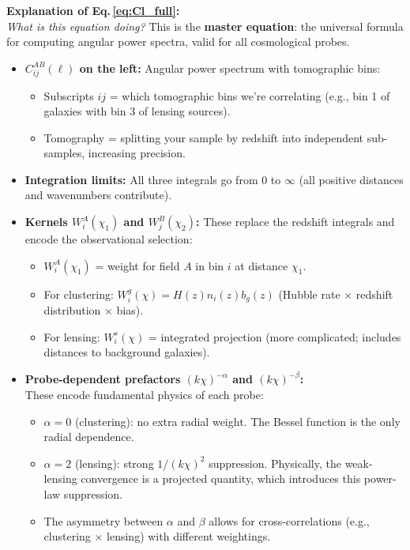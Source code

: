 \noindent\textbf{\large Explanation of Eq.\,\eqref{eq:Cl_full}:}\\
\textit{What is this equation doing?} This is the \textbf{master equation}: the universal formula for computing angular power spectra, valid for all cosmological probes.
\begin{itemize}[leftmargin=1.5cm]
    \item \textbf{$C^{AB}_{ij}(\ell)$ on the left:} Angular power spectrum with tomographic bins:
        \begin{itemize}
            \item Subscripts $ij$ = which tomographic bins we're correlating (e.g., bin 1 of galaxies with bin 3 of lensing sources).
            \item Tomography = splitting your sample by redshift into independent sub-samples, increasing precision.
        \end{itemize}
    
    \item \textbf{Integration limits:} All three integrals go from 0 to $\infty$ (all positive distances and wavenumbers contribute).
    
    \item \textbf{Kernels $W^A_i(\chi_1)$ and $W^B_j(\chi_2)$:} These replace the redshift integrals and encode the observational selection:
        \begin{itemize}
            \item $W^A_i(\chi_1)$ = weight for field $A$ in bin $i$ at distance $\chi_1$.
            \item For clustering: $W^g_i(\chi) = H(z) n_i(z) b_g(z)$ (Hubble rate × redshift distribution × bias).
            \item For lensing: $W^s_i(\chi)$ = integrated projection (more complicated; includes distances to background galaxies).
        \end{itemize}
    
    \item \textbf{Probe-dependent prefactors $(k\chi)^{-\alpha}$ and $(k\chi)^{-\beta}$:}\\
        These encode fundamental physics of each probe:
        \begin{itemize}
            \item $\alpha = 0$ (clustering): no extra radial weight. The Bessel function is the only radial dependence.
            \item $\alpha = 2$ (lensing): strong $1/(k\chi)^2$ suppression. Physically, the weak-lensing convergence is a projected quantity, which introduces this power-law suppression.
            \item The asymmetry between $\alpha$ and $\beta$ allows for cross-correlations (e.g., clustering × lensing) with different weightings.
        \end{itemize}
    

\end{itemize}
